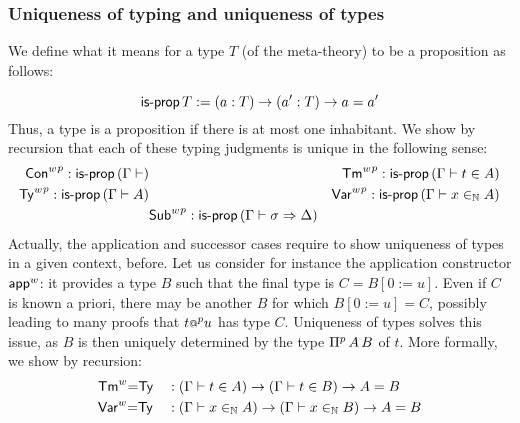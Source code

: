 \subsubsection{Uniqueness of typing and uniqueness of types}
\label{ss:uniq-typing-types}
  We define what it means for a type $T$ (of the meta-theory) to be a proposition as follows:

  \[
    \mathsf{is\text{-}prop}\,T := (a : T) \rightarrow (a' : T) \rightarrow a = a'
  \]
  Thus, a type is a proposition if there is at most
  one inhabitant.
We show by recursion that each of these typing judgments is unique in the
following sense:
\begin{align*}
    {{\mathsf{Con}}^w}^p
  : \mathsf{is\text{-}prop}\, (\Gamma\vdash)
 & &
    {{\mathsf{Tm}}^w}^p
  : \mathsf{is\text{-}prop}\, (\Gamma\vdash t \in A)
    \\
    {{\mathsf{Ty}}^w}^p
  : \mathsf{is\text{-}prop}\, (\Gamma\vdash A)
    &&
    {{\mathsf{Var}}^w}^p
  : \mathsf{is\text{-}prop}\, (\Gamma\vdash x \in_{\mathbb{N}} A)
  \\
  &
        {{\mathsf{Sub}}^w}^p
  : \mathsf{is\text{-}prop}\, (\Gamma\vdash \sigma \Rightarrow \Delta)
  \end{align*}
Actually, the application and successor cases require to show uniqueness of
types in a given context, before.
Let us consider for instance the application constructor ${\mathsf{app}}^w$: it provides a
type $B$ such that the final type is $C=B[0 := u]$. Even if $C$ is known a
priori, there may be another $B$ for which $B[0 := u] = C$, possibly leading to
many proofs that $t{\mathop{{\scriptstyle @}}}^p u$ has type $C$. Uniqueness of types
solves this issue, as $B$ is then uniquely determined by the type ${\Pi}^p\,A\,B$ of $t$.
More formally, we show by recursion:
\begin{alignat*}{5}
  &
  {\mathsf{Tm}}^w{=}\mathsf{Ty} & &:
  (\Gamma \vdash t \in A) \rightarrow
  (\Gamma \vdash t \in B) \rightarrow A = B
  \\
  &
  {\mathsf{Var}}^w{=}\mathsf{Ty} & &:
  (\Gamma \vdash x \in_{\mathbb{N}} A) \rightarrow
  (\Gamma \vdash x \in_{\mathbb{N}} B) \rightarrow A = B
  \end{alignat*}


